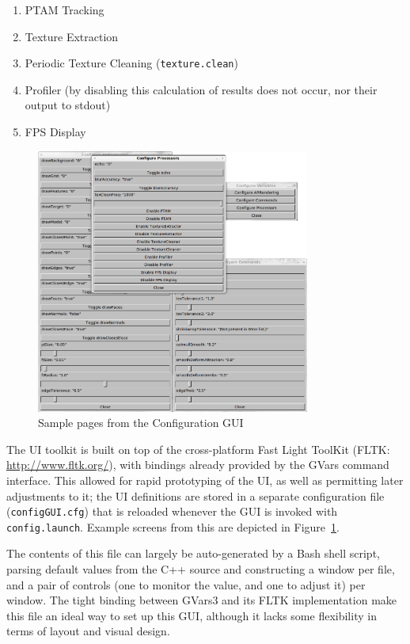 \documentclass[a4paper,10pt]{article}
\begin{document}
\begin{enumerate}
\item{PTAM Tracking}
\item{Texture Extraction}
\item{Periodic Texture Cleaning (\texttt{texture.clean})}
\item{Profiler (by disabling this calculation of results does not occur, nor their output to stdout)}
\item{FPS Display}
\end{enumerate}

\begin{figure}
  \begin{center}
    \includegraphics[width=340px]{Config}
  \end{center}
  \caption{Sample pages from the Configuration GUI}
  \label{configui}
\end{figure}

The UI toolkit is built on top of the cross-platform Fast Light ToolKit (FLTK: \url{http://www.fltk.org/}), with bindings already provided by the GVars command interface. This allowed for rapid prototyping of the UI, as well as permitting later adjustments to it; the UI definitions are stored in a separate configuration file (\texttt{configGUI.cfg}) that is reloaded whenever the GUI is invoked with \texttt{config.launch}. Example screens from this are depicted in Figure~\ref{configui}.

The contents of this file can largely be auto-generated by a Bash shell script, parsing default values from the C++ source and constructing a window per file, and a pair of controls (one to monitor the value, and one to adjust it) per window. The tight binding between GVars3 and its FLTK implementation make this file an ideal way to set up this GUI, although it lacks some flexibility in terms of layout and visual design.
\end{document}
